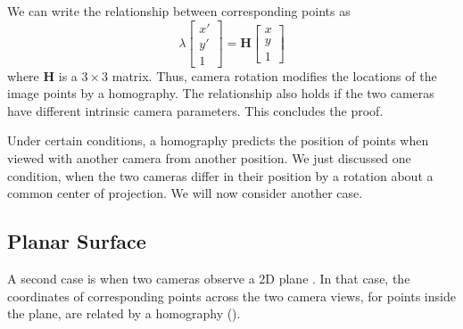 We can write the relationship between corresponding points as
\begin{equation}
    \lambda
    \begin{bmatrix}
        x' \\
        y' \\
        1
    \end{bmatrix}
    =
    \mathbf{H}
    \begin{bmatrix}
        x \\
        y \\
        1
    \end{bmatrix}
\end{equation}
where $\mathbf{H}$ is a $3\times3$  matrix.  Thus, camera rotation modifies the locations of the image points by a homography. The relationship also holds if the two cameras have different intrinsic camera parameters. This concludes the proof.


Under certain conditions, a homography predicts the position of points when viewed with another camera from another position. We just discussed one condition, when the two cameras differ in their position by a rotation about a common center of projection.  We will now consider another case.

\subsection{Planar Surface}

A second case is when two cameras observe a 2D plane \cite{Hartley2004}. In that case, the coordinates of corresponding points across the two camera views, for points inside the plane, are related by a homography (\fig{\ref{fig:example_two_images_facade}}).




